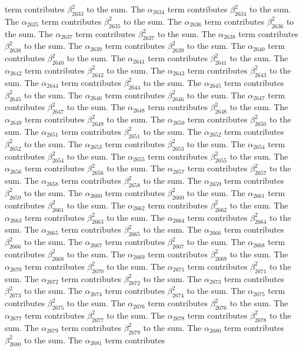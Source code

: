 \begin{lemma}
term contributes $\beta_{2633}^{2}$ to the sum. The $\alpha_{2634}$ term contributes $\beta_{2634}^{2}$ to the sum. The $\alpha_{2635}$ term contributes $\beta_{2635}^{2}$ to the sum. The $\alpha_{2636}$ term contributes $\beta_{2636}^{2}$ to the sum. The $\alpha_{2637}$ term contributes $\beta_{2637}^{2}$ to the sum. The $\alpha_{2638}$ term contributes $\beta_{2638}^{2}$ to the sum. The $\alpha_{2639}$ term contributes $\beta_{2639}^{2}$ to the sum. The $\alpha_{2640}$ term contributes $\beta_{2640}^{2}$ to the sum. The $\alpha_{2641}$ term contributes $\beta_{2641}^{2}$ to the sum. The $\alpha_{2642}$ term contributes $\beta_{2642}^{2}$ to the sum. The $\alpha_{2643}$ term contributes $\beta_{2643}^{2}$ to the sum. The $\alpha_{2644}$ term contributes $\beta_{2644}^{2}$ to the sum. The $\alpha_{2645}$ term contributes $\beta_{2645}^{2}$ to the sum. The $\alpha_{2646}$ term contributes $\beta_{2646}^{2}$ to the sum. The $\alpha_{2647}$ term contributes $\beta_{2647}^{2}$ to the sum. The $\alpha_{2648}$ term contributes $\beta_{2648}^{2}$ to the sum. The $\alpha_{2649}$ term contributes $\beta_{2649}^{2}$ to the sum. The $\alpha_{2650}$ term contributes $\beta_{2650}^{2}$ to the sum. The $\alpha_{2651}$ term contributes $\beta_{2651}^{2}$ to the sum. The $\alpha_{2652}$ term contributes $\beta_{2652}^{2}$ to the sum. The $\alpha_{2653}$ term contributes $\beta_{2653}^{2}$ to the sum. The $\alpha_{2654}$ term contributes $\beta_{2654}^{2}$ to the sum. The $\alpha_{2655}$ term contributes $\beta_{2655}^{2}$ to the sum. The $\alpha_{2656}$ term contributes $\beta_{2656}^{2}$ to the sum. The $\alpha_{2657}$ term contributes $\beta_{2657}^{2}$ to the sum. The $\alpha_{2658}$ term contributes $\beta_{2658}^{2}$ to the sum. The $\alpha_{2659}$ term contributes $\beta_{2659}^{2}$ to the sum. The $\alpha_{2660}$ term contributes $\beta_{2660}^{2}$ to the sum. The $\alpha_{2661}$ term contributes $\beta_{2661}^{2}$ to the sum. The $\alpha_{2662}$ term contributes $\beta_{2662}^{2}$ to the sum. The $\alpha_{2663}$ term contributes $\beta_{2663}^{2}$ to the sum. The $\alpha_{2664}$ term contributes $\beta_{2664}^{2}$ to the sum. The $\alpha_{2665}$ term contributes $\beta_{2665}^{2}$ to the sum. The $\alpha_{2666}$ term contributes $\beta_{2666}^{2}$ to the sum. The $\alpha_{2667}$ term contributes $\beta_{2667}^{2}$ to the sum. The $\alpha_{2668}$ term contributes $\beta_{2668}^{2}$ to the sum. The $\alpha_{2669}$ term contributes $\beta_{2669}^{2}$ to the sum. The $\alpha_{2670}$ term contributes $\beta_{2670}^{2}$ to the sum. The $\alpha_{2671}$ term contributes $\beta_{2671}^{2}$ to the sum. The $\alpha_{2672}$ term contributes $\beta_{2672}^{2}$ to the sum. The $\alpha_{2673}$ term contributes $\beta_{2673}^{2}$ to the sum. The $\alpha_{2674}$ term contributes $\beta_{2674}^{2}$ to the sum. The $\alpha_{2675}$ term contributes $\beta_{2675}^{2}$ to the sum. The $\alpha_{2676}$ term contributes $\beta_{2676}^{2}$ to the sum. The $\alpha_{2677}$ term contributes $\beta_{2677}^{2}$ to the sum. The $\alpha_{2678}$ term contributes $\beta_{2678}^{2}$ to the sum. The $\alpha_{2679}$ term contributes $\beta_{2679}^{2}$ to the sum. The $\alpha_{2680}$ term contributes $\beta_{2680}^{2}$ to the sum. The $\alpha_{2681}$ term contributes 
\end{lemma}
